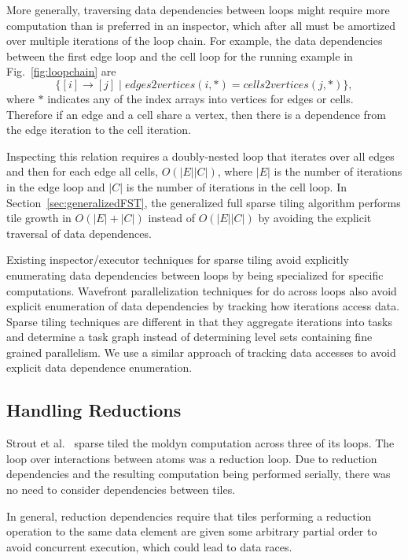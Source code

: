 More generally, traversing data dependencies between loops might require more computation
than is preferred in an inspector, which after all must be amortized over multiple iterations of the loop chain.
For example, the data dependencies between the first edge loop and the 
cell loop for the running example in Fig.~\ref{fig:loopchain} are
\[
	\{ [ i ] \rightarrow [ j ] \; | \; edges2vertices(i,*)=cells2vertices(j,*) \},
\]
where $*$ indicates any of the index arrays into vertices for edges or cells.
Therefore if an edge and a cell share a vertex, then there is a dependence from the edge
iteration to the cell iteration.

Inspecting this relation requires a doubly-nested loop that iterates
over all edges and then for each edge all cells, $O(|E|  |C|)$, where
$|E|$ is the number of iterations in the edge loop and $|C|$ is the number
of iterations in the cell loop.
In Section~\ref{sec:generalizedFST}, the generalized full sparse tiling
algorithm performs tile growth in $O(|E| + |C|)$ instead of $O(|E|  |C|)$
by avoiding the explicit traversal of data dependences.

Existing inspector/executor techniques for sparse tiling avoid
explicitly enumerating data dependencies between loops by being specialized
for specific computations.  Wavefront parallelization techniques
for do across loops also avoid explicit enumeration of data dependencies
by tracking how iterations access data.
Sparse tiling techniques are different in that they aggregate iterations into tasks
and determine a task graph instead of determining level sets containing fine
grained parallelism.  We use a similar approach of tracking data accesses
to avoid explicit data dependence enumeration.



\subsection{Handling Reductions}
\label{sec:reduction}

Strout et al.~\cite{ST-StroutPLDI03} sparse tiled the moldyn computation
across three of its loops.  The loop over interactions between atoms
was a reduction loop.  Due to reduction dependencies and the resulting computation being performed
serially, there was no need to consider dependencies between tiles.

In general, reduction dependencies require that
tiles performing a reduction operation to the same data element
are given some arbitrary
partial order to avoid concurrent execution, which could lead to data races.

